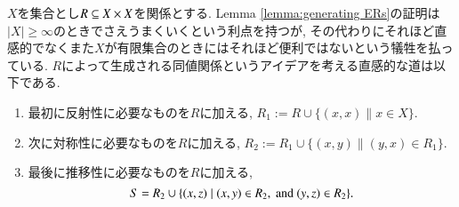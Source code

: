 \begin{remark}


$X$を集合とし$R\ss X\times X$を関係とする. Lemma \ref{lemma:generating ERs}の証明は$|X|\geq\infty$のときでさえうまくいくという利点を持つが, その代わりにそれほど直感的でなくまた$X$が有限集合のときにはそれほど便利ではないという犠牲を払っている. $R$によって生成される同値関係というアイデアを考える直感的な道は以下である.
\begin{enumerate}
\item 最初に反射性に必要なものを$R$に加える, $R_1:=R\cup\{(x,x)\|x\in X\}$.
\item 次に対称性に必要なものを$R$に加える, $R_2:=R_1\cup\{(x,y)\|(y,x)\in R_1\}.$
\item 最後に推移性に必要なものを$R$に加える, $$S=R_2\cup\{(x,z)\|(x,y)\in R_2, \tn{ and } (y,z)\in R_2\}.$$
\end{enumerate}

\end{remark}

